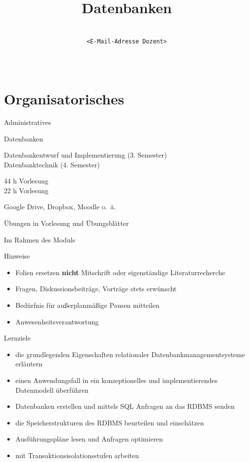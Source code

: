 \documentclass[xcolor,aspectratio=169,hyperref={bookmarks=false}]{beamer}
\title[Datenbanken]{\textbf{Datenbanken}}
\author[\authorname]{\authorname\\ \footnotesize\texttt{<E-Mail-Adresse Dozent>}}
\institute[DHBW Mannheim]{}
\date{\ }
\begin{document}

\maketitle
\onslide

\section*{Organisatorisches}

\begin{frame}{Administratives}
\begin{description}[leftmargin=0cm]
	\item[\textbf{Modul:}] Datenbanken
	\item[\textbf{Lehreinheiten:}] Datenbankentwurf und Implementierung (3. Semester)\\ Datenbanktechnik (4. Semester)
	\item[\textbf{Aufwand:}] 44 h Vorlesung \\ 22 h Vorlesung
	\item[\textbf{Unterlagen:}] Google Drive, Dropbox, Moodle o.~\"a.
	\item[\textbf{\"Ubungen:}] \"Ubungen in Vorlesung und \"Ubungsbl\"atter 
	\item[\textbf{Klausur:}] Im Rahmen des Moduls
\end{description}
\end{frame}

\begin{frame}{Hinweise}
\begin{itemize}
\item Folien ersetzen \textbf{nicht} Mitschrift oder eigenst\"andige Literaturrecherche
\item Fragen, Diskussionsbeiträge, Vorträge stets erwünscht
\item Bedürfnis für außerplanm\"a\ss ige Pausen mitteilen
\item Anwesenheitsverantwortung
\end{itemize}
\end{frame}

\begin{frame}{Lernziele}
	\begin{itemize}
		\item die grundlegenden Eigenschaften relationaler Datenbankmanagementsysteme erläutern
		\item einen Anwendungsfall in ein konzeptionelles und implementierendes Datenmodell überführen 
		\item Datenbanken erstellen und mittels SQL Anfragen an das RDBMS senden
		\item die Speicherstrukturen des RDBMS beurteilen und einschätzen
		\item Ausführungspläne lesen und Anfragen optimieren 
		\item mit Transaktionsisolationsstufen arbeiten 
	\end{itemize}
\end{frame}
\end{document}
